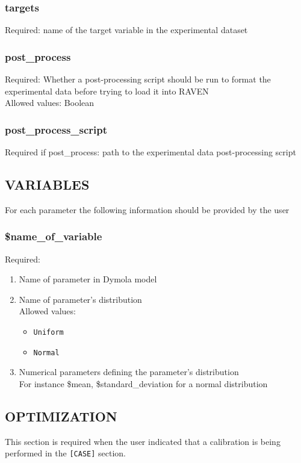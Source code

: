 \documentclass[oneside]{book}
\begin{document}
\subsubsection{targets} Required: name of the target variable in the experimental dataset

\subsubsection{post\_process} Required: Whether a post-processing script should be run to format the experimental data before trying to load it into RAVEN
\\Allowed values: Boolean

\subsubsection{post\_process\_script} Required if post\_process: path to the experimental data post-processing script

\FloatBarrier

\subsection{VARIABLES}
For each parameter the following information should be provided by the user

\subsubsection{\$name\_of\_variable}
Required: 
\begin{enumerate}
    \item Name of parameter in Dymola model
    \item Name of parameter's distribution
    \\Allowed values: 
    \begin{itemize}
        \item \verb|Uniform|
        \item \verb|Normal|
    \end{itemize}
    \item Numerical parameters defining the parameter's distribution
    \\For instance \$mean, \$standard\_deviation for a normal distribution
\end{enumerate}


\subsection{OPTIMIZATION}
This section is required when the user indicated that a calibration is being performed in the \verb|[CASE]| section. 
\end{document}
